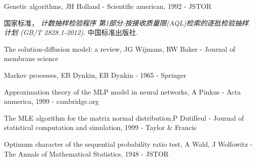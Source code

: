 \documentclass[withoutpreface,bwprint]{cumcmthesis} %
\begin{document}
\begin{thebibliography}{9}%
	Genetic algorithms, JH Holland - Scientific american, 1992 - JSTOR

	国家标准，
	\textit{计数抽样检验程序 第1部分:按接收质量限(AQL)检索的逐批检验抽样计划 (GB/T 2828.1-2012)}. 中国标准出版社.

	The solution-diffusion model: a review, JG Wijmans, RW Baker - Journal of membrane science

	Markov processes, EB Dynkin, EB Dynkin - 1965 - Springer

	Approximation theory of the MLP model in neural networks, A Pinkus - Acta numerica, 1999 - cambridge.org

	The MLE algorithm for the matrix normal distribution,P Dutilleul - Journal of statistical computation and simulation, 1999 - Taylor \& Francis

	Optimum character of the sequential probability ratio test, A Wald, J Wolfowitz - The Annals of Mathematical Statistics, 1948 - JSTOR
\end{thebibliography}

\newpage
\end{document}
